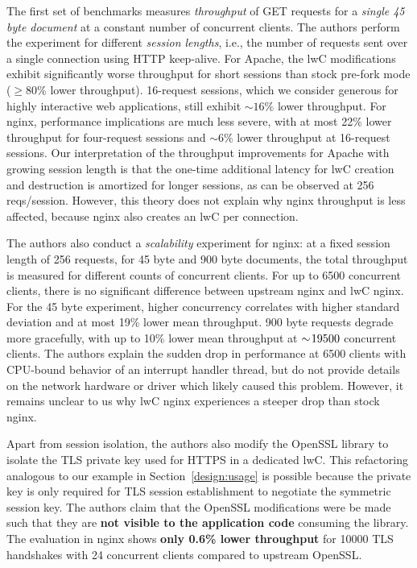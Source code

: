 \documentclass[10pt,twocolumn,a4paper]{article}
\begin{document}
The first set of benchmarks measures \textit{throughput} of GET requests for a \textit{single 45 byte document} at a constant number of concurrent clients.
The authors perform the experiment for different \textit{session lengths}, i.e., the number of requests sent over a single connection using HTTP keep-alive.
For Apache, the lwC modifications exhibit significantly worse throughput for short sessions than stock pre-fork mode ($\ge80\%$ lower throughput).
16-request sessions, which we consider generous for highly interactive web applications, still exhibit $\sim 16\%$ lower throughput.
For nginx, performance implications are much less severe, with at most 22\% lower throughput for four-request sessions and $\sim 6\%$ lower throughput at 16-request sessions.
Our interpretation of the throughput improvements for Apache with growing session length is that the one-time additional latency for lwC creation and destruction is amortized for longer sessions, as can be observed at 256 reqs/session.
However, this theory does not explain why nginx throughput is less affected, because nginx also creates an lwC per connection.
\cite{lwcpaper}

The authors also conduct a \textit{scalability} experiment for nginx:
at a fixed session length of 256 requests, for 45 byte and 900 byte documents, the total throughput is measured for different counts of concurrent clients.
For up to 6500 concurrent clients, there is no significant difference between upstream nginx and lwC nginx.
For the 45 byte experiment, higher concurrency correlates with higher standard deviation and at most 19\% lower mean throughput.
900 byte requests degrade more gracefully, with up to 10\% lower mean throughput at $\sim\hspace{-2pt}19500$ concurrent clients.
The authors explain the sudden drop in performance at 6500 clients with CPU-bound behavior of an interrupt handler thread, but do not provide details on the network hardware or driver which likely caused this problem.
However, it remains unclear to us why lwC nginx experiences a steeper drop than stock nginx.
\cite{lwcpaper}

Apart from session isolation, the authors also modify the OpenSSL library to isolate the TLS private key used for HTTPS in a dedicated lwC.
This refactoring analogous to our example in Section~\ref{design:usage} is possible because the private key is only required for TLS session establishment to negotiate the symmetric session key.
The authors claim that the OpenSSL modifications were be made such that they are \textbf{not visible to the application code} consuming the library.
The evaluation in nginx shows \textbf{only 0.6\% lower throughput} for 10000 TLS handshakes with 24 concurrent clients compared to upstream OpenSSL.
\cite{lwcpaper}
\end{document}
